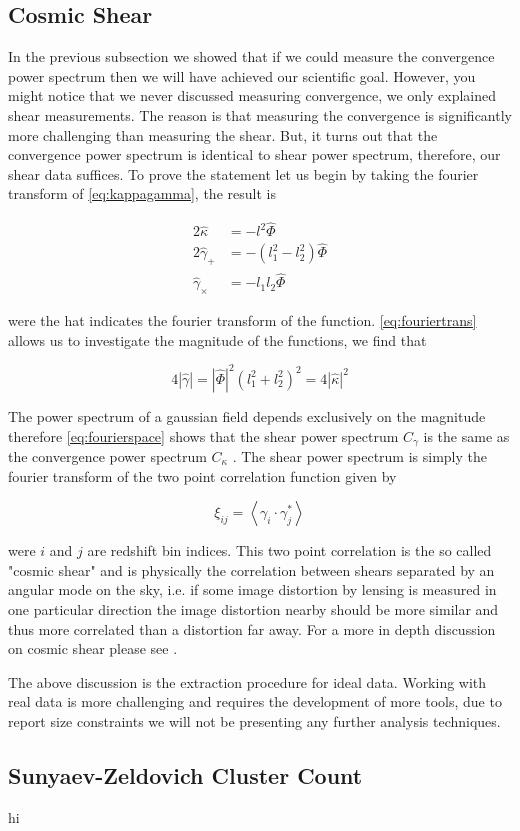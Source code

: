 \subsection{Cosmic Shear}
In the previous subsection we showed that if we could measure the convergence power spectrum then we will have achieved our scientific goal. However, you might notice that we never discussed measuring convergence, we only explained shear measurements. The reason is that measuring the convergence is significantly more challenging than measuring the shear. But, it turns out that the convergence power spectrum is identical to shear power spectrum, therefore, our shear data suffices. To prove the statement let us begin by taking the fourier transform of \autoref{eq:kappagamma}, the result is 

\begin{equation}
    \begin{split}
        2\hat{\kappa} &= -l^2 \hat{\Phi} \\
        2 \hat{\gamma}_+ &= -(l_1^2-l_2^2) \hat{\Phi} \\
        \hat{\gamma}_\times &= -l_1l_2 \hat{\Phi}
    \end{split}
    \label{eq:fouriertrans}
\end{equation}

were the hat indicates the fourier transform of the function. \autoref{eq:fouriertrans} allows us to investigate the magnitude of the functions, we find that

\begin{equation}
    4|\hat{\gamma}| = |\hat{\Phi}|^2 \left(l_1^2+l_2^2\right)^2 = 4 |\hat{\kappa}|^2
    \label{eq:fourierspace}
\end{equation}

The power spectrum of a gaussian field depends exclusively on the magnitude therefore \autoref{eq:fourierspace} shows that the shear power spectrum $C_\gamma$ is the same as the convergence power spectrum $C_\kappa$ \cite{Bartelmann:2016dvf,Hoekstra:2013gua,rachel_2018,general_2013}. The shear power spectrum is simply the fourier transform of the two point correlation function given by 

\begin{equation}
    \xi_{ij} = \left< \gamma_i \cdot \gamma_j^*\right> 
    \label{eq:2ptcorrelation}
\end{equation}

were $i$ and $j$ are redshift bin indices. This two point correlation is the so called "cosmic shear" and is physically the correlation between shears separated by an angular mode on the sky, i.e. if some image distortion by lensing is measured in one particular direction the image distortion nearby should be more similar and thus more correlated than a distortion far away. For a more in depth discussion on cosmic shear please see \cite{lensingbook,general_2013,Hoekstra:2013gua,Bartelmann:2016dvf}.

 \par The above discussion is the extraction procedure for ideal data. Working with real data is more challenging and requires the development of more tools, due to report size constraints we will not be presenting any further analysis techniques.

 \subsection{Sunyaev-Zeldovich Cluster Count}
 hi
